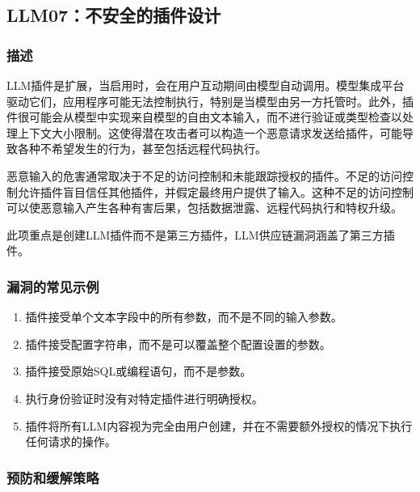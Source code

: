 \documentclass[
]{article}
\author{}
\date{}
\providecommand{\tightlist}{%
  \setlength{\itemsep}{0pt}\setlength{\parskip}{0pt}}
\begin{document}
\subsection{LLM07：不安全的插件设计}\label{llm07ux4e0dux5b89ux5168ux7684ux63d2ux4ef6ux8bbeux8ba1}

\subsubsection{描述}\label{ux63cfux8ff0}

LLM插件是扩展，当启用时，会在用户互动期间由模型自动调用。模型集成平台驱动它们，应用程序可能无法控制执行，特别是当模型由另一方托管时。此外，插件很可能会从模型中实现来自模型的自由文本输入，而不进行验证或类型检查以处理上下文大小限制。这使得潜在攻击者可以构造一个恶意请求发送给插件，可能导致各种不希望发生的行为，甚至包括远程代码执行。

恶意输入的危害通常取决于不足的访问控制和未能跟踪授权的插件。不足的访问控制允许插件盲目信任其他插件，并假定最终用户提供了输入。这种不足的访问控制可以使恶意输入产生各种有害后果，包括数据泄露、远程代码执行和特权升级。

此项重点是创建LLM插件而不是第三方插件，LLM供应链漏洞涵盖了第三方插件。

\subsubsection{漏洞的常见示例}\label{ux6f0fux6d1eux7684ux5e38ux89c1ux793aux4f8b}

\begin{enumerate}
\def\labelenumi{\arabic{enumi}.}
\tightlist
\item
  插件接受单个文本字段中的所有参数，而不是不同的输入参数。
\item
  插件接受配置字符串，而不是可以覆盖整个配置设置的参数。
\item
  插件接受原始SQL或编程语句，而不是参数。
\item
  执行身份验证时没有对特定插件进行明确授权。
\item
  插件将所有LLM内容视为完全由用户创建，并在不需要额外授权的情况下执行任何请求的操作。
\end{enumerate}

\subsubsection{预防和缓解策略}\label{ux9884ux9632ux548cux7f13ux89e3ux7b56ux7565}
\end{document}
